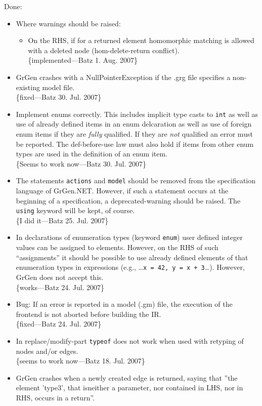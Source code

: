 \documentclass[12pt,a4paper]{article}
\begin{document}
\noindent
Done:
\begin{itemize}
	\item Where warnings should be raised:
		\begin{itemize}
			\item On the RHS, if for a returned element homomorphic matching is allowed with a deleted node (hom-delete-return conflict).\\
				\{implemented---Batz 1. Aug. 2007\}
		\end{itemize}
    \item GrGen crashes with a NullPointerException if the .grg file specifies a non-existing model file.\\
		\{fixed---Batz 30. Jul. 2007\}
	\item Implement enums correctly. This includes implicit type casts to {\tt int} as well as use of already defined items in an enum delcaration as well as use of foreign enum items if they are \emph{fully} qualified.
		If they are \emph{not} qualified an error must be reported.
		The def-before-use law must also hold if items from other enum types are used in the definition of an enum item.\\
		\{Seems to work now---Batz 30. Jul. 2007\}
	\item The statements {\tt actions} and {\tt model} should be removed from the specification language of GrGen.NET.
		However, if such a statement occurs at the beginning of a specification, a deprecated-warning should be raised.
		The {\tt using} keyword will be kept, of course.\\
		\{I did it---Batz 25. Jul. 2007\}
	\item In declarations of enumeration types (keyword {\tt enum}) user defined integer values can be assigned to elements.
	  However, on the RHS of such "`assignments"' it should be possible to use already defined elements of that enumeration types in expressions (e.g., \dots{}{\tt{}x = 42, y = x + 3}\dots). However, GrGen does not accept this.\\
		\{works---Batz 24. Jul. 2007\}
	\item Bug: If an error is reported in a model (.gm) file, the execution of the frontend is not aborted before building the IR.\\
		\{fixed---Batz 24. Jul. 2007\}
	\item In replace/modify-part {\tt typeof} does not work when used with retyping of nodes and/or edges.\\
		\{seems to work now---Batz 18. Jul. 2007\}
    \item GrGen crashes when a newly created edge is returned, saying that ''the element 'type3', that isneither a parameter, nor contained in LHS, nor in RHS, occurs in a return''.

\end{itemize}
\end{document}

